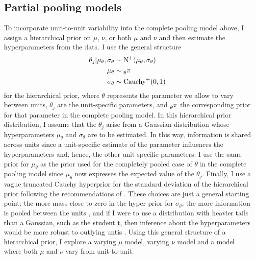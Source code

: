 \subsection{Partial pooling models} \label{subsec:partial-pooling}

To incorporate unit-to-unit variability into the complete pooling model above, I assign a hierarchical prior on $\mu$, $\nu$, or both $\mu$ and $\nu$ and then estimate the hyperparameters from the data. I use the general structure
\begin{align*}
   \theta_j| \mu_\theta, \sigma_\theta & \sim \mbox{N}^{+}(\mu_\theta, \sigma_\theta) \\
   \mu_\theta & \sim \prescript{}{\theta}{\pi}\\
   \sigma_\theta & \sim \mbox{Cauchy}^{+}(0, 1) \\
\end{align*}
for the hierarchical prior, where $\theta$ represents the parameter we allow to vary between units, $\theta_j$ are the unit-specific parameters, and $\prescript{}{\theta}{\pi}$ the corresponding prior for that parameter in the complete pooling model. In this hierarchical prior distribution, I assume that the $\theta_j$ arise from a Gaussian distribution whose hyperparameters $\mu_\theta$ and $\sigma_\theta$ are to be estimated. In this way, information is shared across units since a unit-specific estimate of the parameter influences the hyperparameters and, hence, the other unit-specific parameters. I use the same prior for $\mu_\theta$ as the prior used for the completely pooled case of $\theta$ in the complete pooling model since $\mu_\theta$ now expresses the expected value of the $\theta_j$. Finally, I use a vague truncated Cauchy hyperprior for the standard deviation of the hierarchical prior following the recommendations of \citet[chap.~17]{BDA2020}. These choices are just a general starting point; the more mass close to zero in the hyper prior for $\sigma_\theta$, the more information is pooled between the units \citep{McElreath_2020}, and if I were to use a distribution with heavier tails than a Gaussian, such as the student t, then inference about the hyperparameters would be more robust to outlying untis \citep[chap.~17]{BDA2020}. Using this general structure of a hierarchical prior, I explore a varying $\mu$ model, varying $\nu$ model and a model where both $\mu$ and $\nu$ vary from unit-to-unit.

